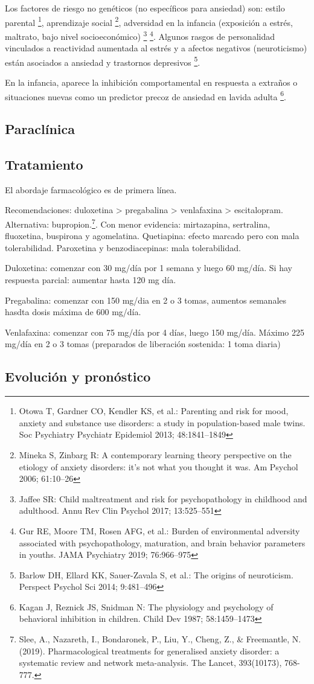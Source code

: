 Los factores de riesgo no genéticos (no específicos para ansiedad) son: estilo parental \footnote{Otowa T, Gardner CO, Kendler KS, et al.: Parenting and risk for mood, anxiety and substance use disorders: a study in population-based male twins. Soc Psychiatry Psychiatr Epidemiol 2013; 48:1841–1849}, aprendizaje social \footnote{Mineka S, Zinbarg R: A contemporary learning theory perspective on the etiology of anxiety disorders: it’s not what you thought it was. Am Psychol 2006; 61:10–26}, adversidad en la infancia (exposición a estrés, maltrato, bajo nivel socioeconómico) \footnote{Jaffee SR: Child maltreatment and risk for psychopathology in childhood and adulthood. Annu Rev Clin Psychol 2017; 13:525–551} \footnote{Gur RE, Moore TM, Rosen AFG, et al.: Burden of environmental adversity associated with psychopathology, maturation, and brain behavior parameters in youths. JAMA Psychiatry 2019; 76:966–975}. Algunos rasgos de personalidad vinculados a reactividad aumentada al estrés y a afectos negativos (neuroticismo) están asociados a ansiedad y trastornos depresivos \footnote{Barlow DH, Ellard KK, Sauer-Zavala S, et al.: The origins of neuroticism. Perspect Psychol Sci 2014; 9:481–496}.

En la infancia, aparece la inhibición comportamental en respuesta a extraños o situaciones nuevas como un predictor precoz de ansiedad en lavida adulta \footnote{Kagan J, Reznick JS, Snidman N: The physiology and psychology of behavioral inhibition in children. Child Dev 1987; 58:1459–1473}.
\subsection*{Paraclínica}
\subsection*{Tratamiento}
El abordaje farmacológico es de primera línea.

Recomendaciones: duloxetina > pregabalina > venlafaxina > escitalopram. Alternativa: bupropion.\footnote{Slee, A., Nazareth, I., Bondaronek, P., Liu, Y., Cheng, Z., \& Freemantle, N. (2019). Pharmacological treatments for generalised anxiety disorder: a systematic review and network meta-analysis. The Lancet, 393(10173), 768-777.}. Con menor evidencia: mirtazapina, sertralina, fluoxetina, buspirona y agomelatina. Quetiapina: efecto marcado pero con mala tolerabilidad. Paroxetina y benzodiacepinas: mala tolerabilidad.

Duloxetina: comenzar con 30 mg/día por 1 semana y luego 60 mg/día. Si hay respuesta parcial: aumentar hasta 120 mg día.

Pregabalina: comenzar con 150 mg/dia en 2 o 3 tomas, aumentos semanales hasdta dosis máxima de 600 mg/día.

Venlafaxina: comenzar con 75 mg/día por 4 días, luego 150 mg/día. Máximo 225 mg/día en 2 o 3 tomas (preparados de liberación sostenida: 1 toma diaria)
\subsection*{Evolución y pronóstico}
\printbibliography
